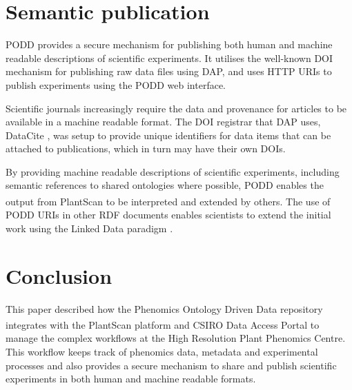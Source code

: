 \documentclass{llncs}
\begin{document}


\section{Semantic publication}
PODD provides a secure mechanism for publishing both human and machine readable
descriptions of scientific experiments. It utilises the well-known DOI mechanism
for publishing raw data files using DAP, and uses HTTP URIs to publish
experiments using the PODD web interface.




Scientific journals increasingly require the data and provenance for articles to
be available in a machine readable format. The DOI registrar that DAP uses,
DataCite \cite{Brase2009}, was setup to provide unique identifiers for data
items that can
be attached to publications, which in turn may have their own DOIs.


By providing machine readable descriptions of scientific experiments, including
semantic references to shared ontologies where possible, PODD enables the output
from PlantScan\textsuperscript{\texttrademark} to be interpreted and extended by
others. The use of PODD URIs
in other RDF documents enables scientists to extend the initial work using the
Linked Data paradigm \cite{BernersLee}.


\section{Conclusion}
This paper described how the Phenomics Ontology Driven Data repository
integrates with the PlantScan\textsuperscript{\texttrademark} platform and CSIRO
Data Access Portal to manage
the complex workflows at the High Resolution Plant Phenomics Centre. This
workflow keeps track of phenomics data, metadata and experimental processes and
also provides a secure mechanism to share and publish scientific experiments in
both human and machine readable formats.
\end{document}

